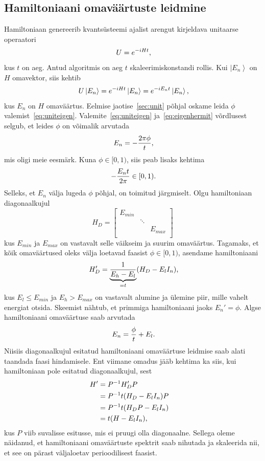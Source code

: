\documentclass[12pt]{report}
\def\ket#1{\left|#1\right>}
\begin{document}
\subsection{Hamiltoniaani omaväärtuste leidmine}\label{sec:ham}

Hamiltoniaan genereerib kvantsüsteemi ajalist arengut kirjeldava unitaarse operaatori
\begin{align}
    U = e^{-iHt} \rlap{,}
\end{align}
kus \(t\) on aeg.
Antud algoritmis on aeg \(t\) skaleerimiskonstandi rollis.
Kui \(\ket{E_n}\) on \(H\) omavektor, siis kehtib
\begin{align}\label{eq:eigenhermit}
    U \ket{E_n} = e^{-iHt}\ket{E_n} = e^{-i E_n t} \ket{E_n} \rlap{,}
\end{align}
kus \(E_n\) on \(H\) omaväärtus.
Eelmise jaotise~\ref{sec:unit} põhjal oskame leida \(\phi\) valemist~\eqref{eq:uniteigen}.
Valemite~\eqref{eq:uniteigen} ja~\eqref{eq:eigenhermit} võrdlusest selgub, et leides \(\phi\) on võimalik arvutada
\begin{align}
    E_n = -\frac{2\pi\phi}{t} \rlap{,}
\end{align}
mis oligi meie eesmärk.
Kuna \(\phi \in [0, 1)\), siis peab lisaks kehtima
\begin{align}
    -\frac{E_n t}{2\pi} \in [0, 1) \rlap{.}
\end{align}
Selleks, et $E_n$ välja lugeda $\phi$ põhjal, on toimitud järgmiselt.
Olgu hamiltoniaan diagonaalkujul
\begin{equation}
H_D=\begin{bmatrix}
    E_{min} & & \\
    & \ddots & \\
    & & E_{max} \\
  \end{bmatrix}
\end{equation}
kus \(E_{min}\) ja \(E_{max}\) on vastavalt selle väikseim ja suurim omaväärtus.
Tagamaks, et kõik omaväärtused oleks välja loetavad faasist $\phi\in[0,1)$, asendame hamiltoniaani
\begin{equation}
  H_D'=\underbrace{\frac{1}{E_h-E_l}}_{=t}(H_D-E_{l}I_n)\rlap,
\end{equation}
kus $E_l \le E_{min}$ ja $E_h>E_{max}$ on vastavalt alumine ja ülemine piir, mille vahelt energiat otsida.
Skeemist nähtub, et primmiga hamiltoniaani jaoks $E_n'=\phi$.
Algse hamiltoniaani omaväärtuse saab arvutada
\begin{equation}
  E_n=\frac{\phi}{t}+E_l\rlap.
\end{equation}
Niisiis diagonaalkujul esitatud hamiltoniaani omaväärtuse leidmise saab alati taandada faasi hindamisele.
Ent viimane omadus jääb kehtima ka siis, kui hamiltoniaan pole esitatud diagonaalkujul, sest
\begin{align}
H'&=P^{-1}H_D'P\cr
  &=P^{-1}t(H_D-E_{l}I_n)P\cr
  &=P^{-1}t(H_DP-E_{l}I_n)\cr
  &=t(H-E_{l}I_n)\rlap,\cr
\end{align}
kus $P$ viib suvalisse esitusse, mis ei pruugi olla diagonaalne.
Sellega oleme näidanud, et hamiltoniaani omaväärtuste spektrit saab nihutada ja skaleerida nii, et see on pärast väljaloetav perioodilisest faasist.
\end{document}
